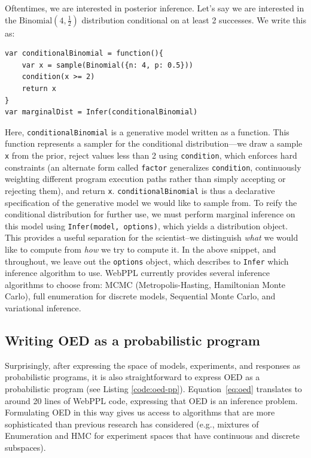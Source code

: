 \documentclass{article}
\begin{document}
Oftentimes, we are interested in posterior inference. Let's say we are interested in the $\text{Binomial}(4, \frac{1}{2})$ distribution conditional on at least 2 successes. We write this as:
%
\begin{lstlisting}[mathescape, label={code:webppl}]
var conditionalBinomial = function(){
	var x = sample(Binomial({n: 4, p: 0.5}))
	condition(x >= 2)
	return x
}
var marginalDist = Infer(conditionalBinomial)
\end{lstlisting}
Here, \lstinline{conditionalBinomial} is a generative model written as a function.
This function represents a sampler for the conditional distribution---we draw a sample \lstinline{x} from the prior, reject values less than 2 using \lstinline{condition}, which enforces hard constraints (an alternate form called \lstinline{factor} generalizes \lstinline{condition}, continuously weighting different program execution paths rather than simply accepting or rejecting them), and return \lstinline{x}.
\lstinline{conditionalBinomial} is thus a declarative specification of the generative model we would like to sample from.
To reify the conditional distribution for further use, we must perform marginal inference on this model using \lstinline{Infer(model, options)}, which yields a distribution object.
This provides a useful separation for the scientist--we distinguish \emph{what} we would like to compute from \emph{how} we try to compute it.
In the above snippet, and throughout, we leave out the \lstinline{options} object, which describes to \lstinline{Infer} which inference algorithm to use. WebPPL currently provides several inference algorithms to choose from: MCMC (Metropolis-Hasting, Hamiltonian Monte Carlo), full enumeration for discrete models, Sequential Monte Carlo, and variational inference.


\subsection{Writing OED as a probabilistic program}

Surprisingly, after expressing the space of models, experiments, and responses as probabilistic programs, it is also straightforward to express OED as a probabilistic program (see Listing \ref{code:oed-pp}).
Equation~\ref{eq:oed} translates to around 20 lines of WebPPL code, expressing that OED is an inference problem.
Formulating OED in this way gives us access to algorithms that are more sophisticated than previous research has considered  (e.g., mixtures of Enumeration and HMC for experiment spaces that have continuous and discrete subspaces).
\end{document}
